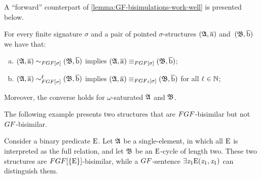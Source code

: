 A ``forward'' counterpart of \cref{lemma:GF-bisimulations-work-well} is presented below.
\begin{lemma}\label{lem:FGF-bisimulations-work-well}
For every finite signature $\sigma$ and a pair of pointed $\sigma$-structures $({\mathfrak{A}}, \overline{\mathrm{a}})$ and~$({\mathfrak{B}}, \overline{\mathrm{b}})$ we have that:
\begin{enumerate}[(a)]
\item $(\str{A}, \elemtuplea) \bisimto_{\FGF[\sigma]} (\str{B}, \elemtupleb)$ implies $(\str{A}, \elemtuplea) \equiv_{\FGF[\sigma]} (\str{B}, \elemtupleb)$;
\item $(\str{A}, \elemtuplea) \bisimto_{\FGF[\sigma]}^{\ell} (\str{B}, \elemtupleb)$ implies $(\str{A}, \elemtuplea) \equiv_{\FGF_\ell[\sigma]} (\str{B}, \elemtupleb)$ for all $\ell \in {\mathbb{N}}$;
\end{enumerate}
Moreover, the converse holds for $\omega$-saturated ${\mathfrak{A}}$ and ${\mathfrak{B}}$.
\end{lemma}


The following example presents two structures that are $\FGF$-bisimilar but not $\GF$-bisimilar.
\begin{example} 
Consider a binary predicate $\mathrm{E}$.
Let ${\mathfrak{A}}$ be a single-element, in which all $\mathrm{E}$ is interpreted as the full relation, and let ${\mathfrak{B}}$ be an $\mathrm{E}$-cycle of length two. These two structures are $\FGF[\{\relE\}]$-bisimilar, while a $\GF$-sentence $\exists{\mathit{x}_1}\mathrm{E}(\mathit{x}_1,\mathit{x}_1)$ can distinguish them.
\end{example}

